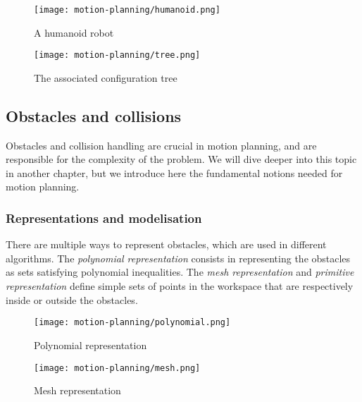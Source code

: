 \begin{figure}[H]
    \centering
    \begin{minipage}{.4\textwidth}
        \centering
        \texttt{[image: motion-planning/humanoid.png]}
        \caption*{A humanoid robot}
    \end{minipage}
    \begin{minipage}{.5\textwidth}
        \centering
        \texttt{[image: motion-planning/tree.png]}
        \caption*{The associated configuration tree}
    \end{minipage}
\end{figure}

\subsection{Obstacles and collisions}
Obstacles and collision handling are crucial in motion planning, and are responsible for the complexity of the problem. We will dive deeper into this topic in another chapter, but we introduce here the fundamental notions needed for motion planning.
\subsubsection{Representations and modelisation}
There are multiple ways to represent obstacles, which are used in different algorithms. The \emph{polynomial representation} consists in representing the obstacles as sets satisfying polynomial inequalities. The \emph{mesh representation} and \emph{primitive representation} define simple sets of points in the workspace that are respectively inside or outside the obstacles.
\begin{figure}[H]
    \centering

    \begin{minipage}{.5\textwidth}
        \centering
        \texttt{[image: motion-planning/polynomial.png]}
        \caption*{Polynomial representation}
    \end{minipage}
    \begin{minipage}{.4\textwidth}
        \centering
        \texttt{[image: motion-planning/mesh.png]}
        \caption*{Mesh representation}
    \end{minipage}
\end{figure}

